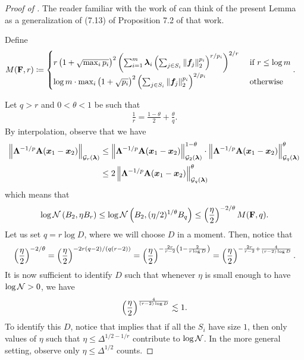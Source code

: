 \documentclass[11pt]{article}
\numberwithin{equation}{section}
\begin{document}
\begin{proof}[Proof of ]
The reader familiar with the work of \citet{blm89} can think of the present Lemma as a generalization of (7.13) of Proposition 7.2 of that work.

Define
\begin{align*}
    M(\mathbf{F},r) &\coloneqq \begin{cases} r\left(1+\sqrt{\max_i p_i}\right)^2\left(\sum_{i=1}^m \bm{\lambda}_i \left(\sum_{j \in S_i} \left\lVert \bm{f}_j \right\rVert_{2}^{p_i}\right)^{r/p_i}\right)^{2/r} & \text{ if } r \le \log m \\ \log m \cdot \max_i \left(1+\sqrt{p_i}\right)^2\left(\sum_{j \in S_i} \left\lVert \bm{f}_j \right\rVert_{2}^{p_i}\right)^{2/p_i} & \text{ otherwise} \end{cases}.
\end{align*}

Let $q > r$ and $0 < \theta < 1$ be such that
\begin{align*}
    \frac{1}{r} = \frac{1-\theta}{2} + \frac{\theta}{q}.
\end{align*}
By interpolation, observe that we have
\begin{align*}
    \left\lVert \mathbf{\Lambda}^{-1/p}\mathbf{A}(\bm{x}_1-\bm{x}_2) \right\rVert_{\mathcal{G}_{r}(\bm{\lambda})} &\le \left\lVert \mathbf{\Lambda}^{-1/p}\mathbf{A}(\bm{x}_1-\bm{x}_2) \right\rVert_{\mathcal{G}_{2}(\bm{\lambda})}^{1-\theta} \cdot \left\lVert \mathbf{\Lambda}^{-1/p}\mathbf{A}(\bm{x}_1-\bm{x}_2) \right\rVert_{\mathcal{G}_{q}(\bm{\lambda})}^{\theta} \\
    &\le 2\left\lVert \mathbf{\Lambda}^{-1/p}\mathbf{A}(\bm{x}_1-\bm{x}_2) \right\rVert_{\mathcal{G}_{q}(\bm{\lambda})}^{\theta}
\end{align*}
which means that
\begin{align*}
    \log\mathcal{N}\left(B_2,\eta B_r\right) \le \log\mathcal{N}\left(B_2,(\eta/2)^{1/\theta}B_q\right) \le \left(\frac{\eta}{2}\right)^{-2/\theta}M(\mathbf{F},q).
\end{align*}
Let us set $q = r\log D$, where we will choose $D$ in a moment. Then, notice that
\begin{align*}
    \left(\frac{\eta}{2}\right)^{-2/\theta} = \left(\frac{\eta}{2}\right)^{-2r(q-2)/(q(r-2))} = \left(\frac{\eta}{2}\right)^{-\frac{2r}{r-2}\left(1-\frac{2}{r\log D}\right)} = \left(\frac{\eta}{2}\right)^{-\frac{2r}{r-2} + \frac{4}{(r-2)\log D}}.
\end{align*}
It is now sufficient to identify $D$ such that whenever $\eta$ is small enough to have $\log\mathcal{N} > 0$, we have
\begin{align*}
    \left(\frac{\eta}{2}\right)^{\frac{4}{(r-2)\log D}} \lesssim 1.
\end{align*}
To identify this $D$, notice that  implies that if all the $S_i$ have size $1$, then only values of $\eta$ such that $\eta \le \Delta^{1/2-1/r}$ contribute to $\log\mathcal{N}$. In the more general setting, observe only $\eta \le \Delta^{1/2}$ counts.


\end{proof}
\end{document}
